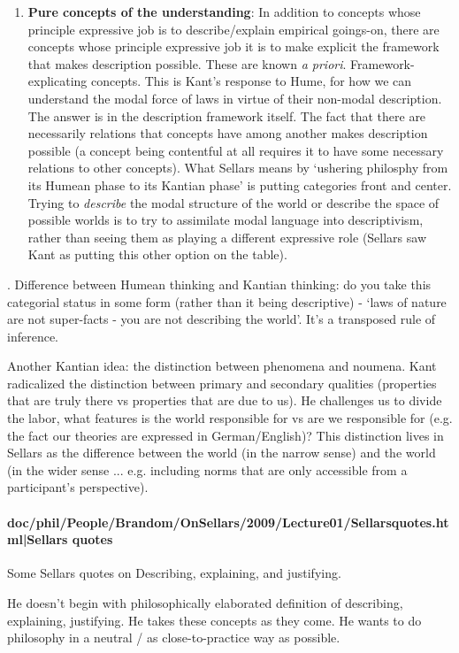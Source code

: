 \documentclass[12pt,a4paper]{report}
\begin{document}
\begin{enumerate}
\item \textbf{Pure concepts of the understanding}: In addition to concepts whose principle expressive job is to describe/explain empirical goings-on, there are concepts whose principle expressive job it is to make explicit the framework that makes description possible. These are known \textit{a priori}. Framework-explicating concepts. This is Kant's response to Hume, for how we can understand the modal force of laws in virtue of their non-modal description. The answer is in the description framework itself. The fact that there are necessarily relations that concepts have among another makes description possible (a concept being contentful at all requires it to have some necessary relations to other concepts). What Sellars means by `ushering philosphy from its Humean phase to its Kantian phase' is putting categories front and center. Trying to \emph{describe} the modal structure of the world or describe the space of possible worlds is to try to assimilate modal language into descriptivism, rather than seeing them as playing a different expressive role (Sellars saw Kant as putting this other option on the table).
\end{enumerate}. Difference between Humean thinking and Kantian thinking: do you take this categorial status in some form (rather than it being descriptive) - `laws of nature are not super-facts - you are not describing the world'. It's a transposed rule of inference.

Another Kantian idea: the distinction between phenomena and noumena. Kant radicalized the distinction between primary and secondary qualities (properties that are truly there vs properties that are due to us). He challenges us to divide the labor, what features is the world responsible for vs are we responsible for (e.g. the fact our theories are expressed in German/English)? This distinction lives in Sellars as the difference between the world (in the narrow sense) and the world (in the wider sense ... e.g. including norms that are only accessible from a participant's perspective).

\paragraph{doc/phil/People/Brandom/OnSellars/2009/Lecture01/Sellarsquotes.html|Sellars quotes}
Some Sellars quotes on Describing, explaining, and justifying.

He doesn't begin with philosophically elaborated definition of describing, explaining, justifying. He takes these concepts as they come. He wants to do philosophy in a neutral / as close-to-practice way as possible.
\end{document}
